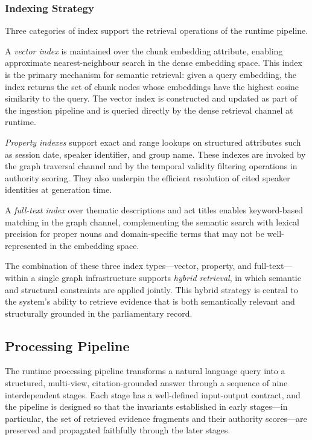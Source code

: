 \subsubsection{Indexing Strategy}

Three categories of index support the retrieval operations of the runtime pipeline.

A \textit{vector index} is maintained over the chunk embedding attribute, enabling
approximate nearest-neighbour search in the dense embedding space. This index is the
primary mechanism for semantic retrieval: given a query embedding, the index returns the
set of chunk nodes whose embeddings have the highest cosine similarity to the query. The
vector index is constructed and updated as part of the ingestion pipeline and is queried
directly by the dense retrieval channel at runtime.

\textit{Property indexes} support exact and range lookups on structured attributes such as
session date, speaker identifier, and group name. These indexes are invoked by the graph
traversal channel and by the temporal validity filtering operations in authority scoring.
They also underpin the efficient resolution of cited speaker identities at generation time.

A \textit{full-text index} over thematic descriptions and act titles enables keyword-based
matching in the graph channel, complementing the semantic search with lexical precision
for proper nouns and domain-specific terms that may not be well-represented in the
embedding space.

The combination of these three index types---vector, property, and full-text---within a
single graph infrastructure supports \textit{hybrid retrieval}, in which semantic and
structural constraints are applied jointly. This hybrid strategy is central to the system's
ability to retrieve evidence that is both semantically relevant and structurally grounded
in the parliamentary record.


\subsection{Processing Pipeline}
\label{sec:processing-pipeline}

The runtime processing pipeline transforms a natural language query into a structured,
multi-view, citation-grounded answer through a sequence of nine interdependent stages.
Each stage has a well-defined input-output contract, and the pipeline is designed so that
the invariants established in early stages---in particular, the set of retrieved evidence
fragments and their authority scores---are preserved and propagated faithfully through the
later stages.

